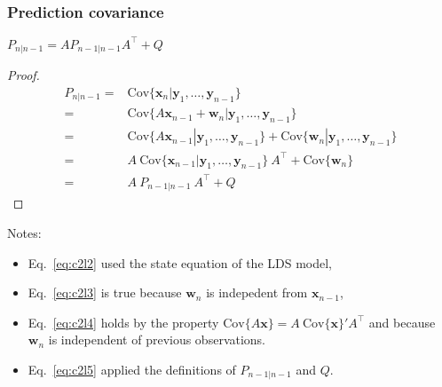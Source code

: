 \begin{frame}
    \frametitle{Prediction covariance}
\scriptsize
\begin{claim}
    $P_{n|n-1}=AP_{n-1|n-1}A^\intercal+Q$
    \label{claim:predictionCov}
\end{claim}

\begin{proof}
    \begin{align}
        P_{n|n-1}=&\text{Cov}\{\mathbf{x}_n|\mathbf{y}_1,\ldots,\mathbf{y}_{n-1}\}\nonumber\\
                 =&\text{Cov}\{A\mathbf{x}_{n-1}+\mathbf{w}_n|\mathbf{y}_1,\ldots,\mathbf{y}_{n-1}\}\label{eq:c2l2}\\
                 =&\text{Cov}\{A\mathbf{x}_{n-1}|\mathbf{y}_1,\ldots,\mathbf{y}_{n-1}\}+\text{Cov}\{\mathbf{w}_n|\mathbf{y}_1,\ldots,\mathbf{y}_{n-1}\}\label{eq:c2l3}\\
                 =&A\ \text{Cov}\{\mathbf{x}_{n-1}|\mathbf{y}_1,\ldots,\mathbf{y}_{n-1}\}\ A^\intercal+\text{Cov}\{\mathbf{w}_n\}\label{eq:c2l4}\\
                 =&A\ P_{n-1|n-1}\ A^\intercal+Q\label{eq:c2l5}
    \end{align}
\end{proof}

Notes:

\begin{itemize}
    \item Eq.~\ref{eq:c2l2} used the state equation of the LDS model,
    \item Eq.~\ref{eq:c2l3} is true because $\mathbf{w}_n$ is indepedent from
        $\mathbf{x}_{n-1}$,
    \item Eq.~\ref{eq:c2l4} holds by the property
        $\text{Cov}\{A\mathbf{x}\}=A\ \text{Cov}\{\mathbf{x}\}' A^\intercal$ and
        because $\mathbf{w}_n$ is independent of previous observations.
    \item Eq.~\ref{eq:c2l5} applied the definitions of $P_{n-1|n-1}$ and $Q$.
\end{itemize}
\end{frame}

